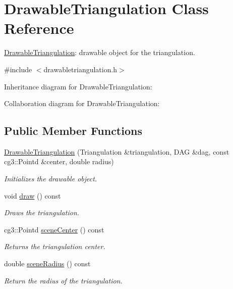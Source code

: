 \hypertarget{classDrawableTriangulation}{}\section{Drawable\+Triangulation Class Reference}
\label{classDrawableTriangulation}


\hyperlink{classDrawableTriangulation}{Drawable\+Triangulation}\+: drawable object for the triangulation.  




{\ttfamily \#include $<$drawabletriangulation.\+h$>$}



Inheritance diagram for Drawable\+Triangulation\+:


Collaboration diagram for Drawable\+Triangulation\+:
\subsection*{Public Member Functions}
\begin{DoxyCompactItemize}
\item 
\hyperlink{classDrawableTriangulation_a7285109cc73a2d0a233cccd0cb9278a4}{Drawable\+Triangulation} (Triangulation \&triangulation, D\+AG \&dag, const cg3\+::\+Pointd \&center, double radius)
\begin{DoxyCompactList}\small\item\em Initializes the drawable object. \end{DoxyCompactList}\item 
void \hyperlink{classDrawableTriangulation_a364e9b612571481930770fdfa9d68148}{draw} () const
\begin{DoxyCompactList}\small\item\em Draws the triangulation. \end{DoxyCompactList}\item 
cg3\+::\+Pointd \hyperlink{classDrawableTriangulation_a3198ae77285c354fd020f5b18df718f5}{scene\+Center} () const
\begin{DoxyCompactList}\small\item\em Returns the triangulation center. \end{DoxyCompactList}\item 
double \hyperlink{classDrawableTriangulation_a0aee9121b146c327dbbd741c3dc58c0a}{scene\+Radius} () const
\begin{DoxyCompactList}\small\item\em Return the radius of the triangulation. \end{DoxyCompactList}\end{DoxyCompactItemize}


